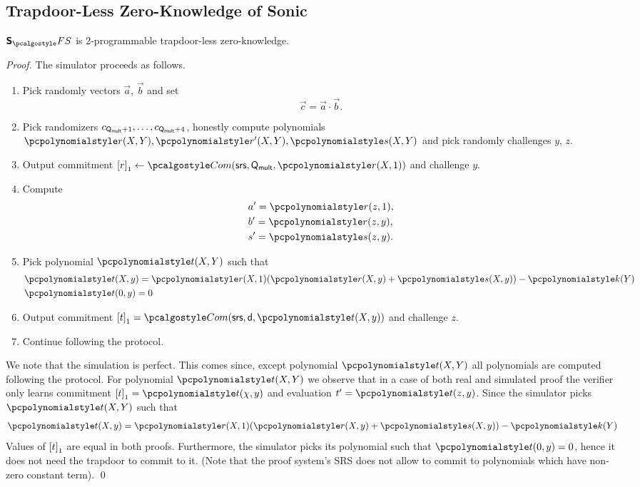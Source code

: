 \subsection{Trapdoor-Less Zero-Knowledge of Sonic}
\begin{lemma}
\label{lem:sonic_hvzk}
$\sonicprotfs$ is 2-programmable trapdoor-less zero-knowledge.
\end{lemma}
\begin{proof}
  The simulator proceeds as follows.
  \begin{enumerate}
  \item Pick randomly vectors $\vec{a}$, $\vec{b}$ and set
    \begin{equation}
      \label{eq:ab_eq_c}
      \vec{c} = \vec{a} \cdot \vec{b}. 
    \end{equation}
  \item Pick randomizers $c_{\mathsf{Q_{mult}} + 1}, \ldots, c_{\mathsf{Q_{mult}} + 4}$,
    honestly compute polynomials $\p{r}(X, Y), \p{r'}(X, Y), \p{s}(X, Y)$ and
    pick randomly challenges $y$, $z$.
  \item Output commitment $\gone{r} \gets \com(\srs, \multconstr, \p{r} (X,
    1))$ and challenge $y$. 
  \item Compute
    \begin{align*}
      & a' = \p{r}(z, 1),\\
      & b' = \p{r}(z, y),\\
      & s' = \p{s}(z, y).
    \end{align*} 
  \item Pick polynomial $\p{t}(X, Y)$ such that
    \begin{align*}
      & \p{t} (X, y) = \p{r} (X, 1) (\p{r}(X, y) + \p{s} (X, y)) - \p{k} (Y)\\
      & \p{t} (0, y) = 0
    \end{align*}
  \item Output commitment $\gone{t} = \com (\srs, \dconst, \p{t} (X, y))$ and
    challenge $z$.
  \item Continue following the protocol.
  \end{enumerate}

  We note that the simulation is perfect. This comes since, except polynomial
  $\p{t} (X, Y)$ all polynomials are computed following the protocol. For
  polynomial $\p{t} (X, Y)$ we observe that in a case of both real and simulated
  proof the verifier only learns commitment $\gone{t} = \p{t} (\chi, y)$ and
  evaluation $t' = \p{t} (z, y)$. Since the simulator picks $\p{t} (X, Y)$ such
  that 
  \begin{align*}
      \p{t} (X, y) = \p{r} (X, 1) (\p{r}(X, y) + \p{s} (X, y)) - \p{k} (Y)
  \end{align*}
  Values of $\left[t\right]_{1}$ are equal in both proofs.
  Furthermore, the simulator picks its polynomial such that $\p{t}(0, y) = 0$,
  hence it does not need the trapdoor to commit to it. (Note that the proof
  system's SRS does not allow to commit to polynomials which have non-zero
  constant term). \qed
\end{proof}
